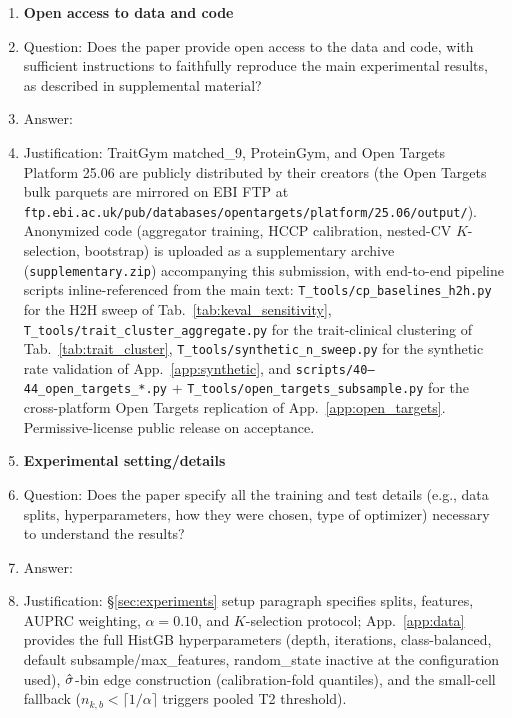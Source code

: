 \begin{enumerate}
\item {\bf Open access to data and code}
    \item[] Question: Does the paper provide open access to the data and code, with sufficient instructions to faithfully reproduce the main experimental results, as described in supplemental material?
    \item[] Answer: \answerYes{}
    \item[] Justification: TraitGym matched\_9, ProteinGym, and Open Targets Platform 25.06 are publicly distributed by their creators (the Open Targets bulk parquets are mirrored on EBI FTP at \texttt{ftp.ebi.ac.uk/pub/databases/opentargets/platform/25.06/output/}). Anonymized code (aggregator training, HCCP calibration, nested-CV $K$-selection, bootstrap) is uploaded as a supplementary archive (\texttt{supplementary.zip}) accompanying this submission, with end-to-end pipeline scripts inline-referenced from the main text: \texttt{T\_tools/cp\_baselines\_h2h.py} for the H2H sweep of Tab.~\ref{tab:keval_sensitivity}, \texttt{T\_tools/trait\_cluster\_aggregate.py} for the trait-clinical clustering of Tab.~\ref{tab:trait_cluster}, \texttt{T\_tools/synthetic\_n\_sweep.py} for the synthetic rate validation of App.~\ref{app:synthetic}, and \texttt{scripts/40--44\_open\_targets\_*.py} + \texttt{T\_tools/open\_targets\_subsample.py} for the cross-platform Open Targets replication of App.~\ref{app:open_targets}. Permissive-license public release on acceptance.

\item {\bf Experimental setting/details}
    \item[] Question: Does the paper specify all the training and test details (e.g., data splits, hyperparameters, how they were chosen, type of optimizer) necessary to understand the results?
    \item[] Answer: \answerYes{}
    \item[] Justification: §\ref{sec:experiments} setup paragraph specifies splits, features, AUPRC weighting, $\alpha = 0.10$, and $K$-selection protocol; App.~\ref{app:data} provides the full HistGB hyperparameters (depth, iterations, class-balanced, default subsample/max\_features, random\_state inactive at the configuration used), $\hat{\sigma}$-bin edge construction (calibration-fold quantiles), and the small-cell fallback ($n_{k,b} < \lceil 1/\alpha\rceil$ triggers pooled T2 threshold).


\end{enumerate}
